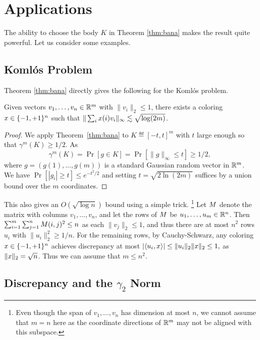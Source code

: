 \section{Applications}
The ability to choose the body $K$ in Theorem \ref{thm:bana} makes the result quite powerful. Let us consider some  examples. 

\subsection{Koml\'os Problem}
Theorem \ref{thm:bana} directly gives the following for the Koml\'{o}s problem.
    
\begin{theorem}
\label{thm:komlos-bana}
Given vectors $v_1,\ldots,v_n \in \mathbb{R}^m$ with $\|v_i\|_2 \leq 1$, there
exists a coloring $x \in \{-1,+1\}^n$ such that   $\|\sum_i x(i)
v_i\|_\infty \lesssim \sqrt{\log(2m)}$.
\end{theorem}
\begin{proof}
    We apply Theorem~\ref{thm:bana} to $K\eqdef[-t,t]^m$ with $t$ large enough so that $\gamma^m(K)\geq 1/2$. As
    \[\gamma^m(K) = \Pr[ g \in K] = \Pr[\|g\|_\infty \leq t] \geq 1/2 ,\]   
    where $g=(g(1),\ldots,g(m))$ is a standard Gaussian random vector
    in $\mathbb{R}^m$. We have
     $\Pr[|g_i| \geq t] \leq e^{-t^2/2}$ and setting $t= \sqrt{2\ln(2m)}$ suffices by a union bound over the $m$ coordinates.
\end{proof}

\begin{remark}
\label{rem:bana-komlos-trick}
   This also gives an $O(\sqrt{\log n})$ bound using a simple
   trick. \footnote{Even though the span of $v_1,\ldots,v_n$ has
     dimension at most $n$, we cannot assume that $m=n$ here as the
     coordinate directions of $\mathbb{R}^m$ may not be aligned with this
     subspace.} Let $M$ denote the matrix with columns
   $v_1,\ldots,v_n$, and let the rows of $M$ be $u_1, \ldots, u_m
   \in \mathbb{R}^n$. Then $\sum_{i=1}^m\sum_{j=1}^n M(i,j)^2 \leq n$  as
   each $\|v_j\|_2\leq 1$, and thus there are at most $n^2$ rows $u_i$
   with $\|u_i\|_2^2 \geq 1/n$. For the remaining rows, by
   Cauchy-Schwarz, any coloring $x \in \{-1,+1\}^n$  achieves
   discrepancy at most
   \(
     |\langle u_i,x\rangle| \le \|u_i\|_2 \|x\|_2 \le 1,
   \)
   as $\|x\|_2 = \sqrt{n}$. Thus we can assume that $m\leq n^2$.
\end{remark}

\subsection{Discrepancy and the $\gamma_2$ Norm}

